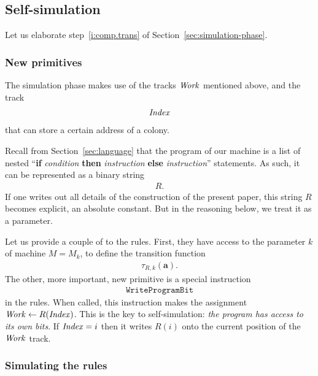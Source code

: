 \documentclass[11pt]{memoir}
\theoremstyle{definition} %
\renewcommand{\vek}[1]{\mathbf{#1}}
\newcommand{\fld}[1]{\ensuremath{\textit{#1\/}}}
\newcommand{\rul}[1]{\ensuremath{\texttt{#1}}}
\newcommand{\va}{\vek{a}} %
\newcommand{\Q}{Q} %
\newcommand{\Index}{\fld{Index}}
\newcommand{\Work}{\fld{Work}} %
\newcommand{\WriteProgramBit}{\rul{WriteProgramBit}}
\begin{document}

\subsection{Self-simulation}\label{sec:self-simulation}

Let us elaborate step~\ref{i:comp.trans} of Section~\ref{sec:simulation-phase}.

\subsubsection{New primitives}

The simulation phase makes use of the tracks \( \Work \) mentioned above, and the track
\begin{align*}
   \Index
 \end{align*}
that can store a certain address of a colony.

Recall from Section~\ref{sec:language} that the program
of our machine is a list of nested
``\textbf{if} \emph{condition} \textbf{then} \emph{instruction}
\textbf{else} \emph{instruction}''
statements.
As such, it can be represented as a binary string 
 \begin{align*}
   R.
 \end{align*}
If one writes out all details of the construction of the present paper, this string \( R \)
becomes explicit, an absolute constant.
But in the reasoning below, we treat it as a parameter.

Let us provide a couple of  to the rules.
First, they have access to the parameter \( k \) of machine \( M=M_{k} \), 
to define the transition function
 \begin{align*}
            \tau_{R,k}(\va).
 \end{align*}
The other, more important, new primitive is a special instruction
 \begin{align*}
   \WriteProgramBit
 \end{align*}
in the rules.
When called, this instruction makes the assignment \( \Work\gets R(\Index) \).
This is the key to self-simulation: \emph{the program has
access to its own bits}.
If \( \Index=i \) then it writes \( R(i) \) onto the current position of the \( \Work \) track.


\subsubsection{Simulating the rules}
\end{document}
